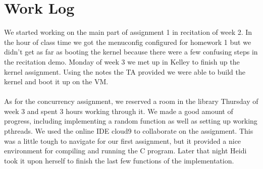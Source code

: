 \documentclass{article}
\begin{document}
\section*{Work Log}
We started working on the main part of assignment 1 in recitation of week 2. In the hour of 
class time we got the menuconfig configured for homework 1 but we didn't get as far as booting
the kernel because there were a few confusing steps in the recitation demo. Monday of week 3
we met up in Kelley to finish up the kernel assignment. Using the notes the TA provided we were
able to build the kernel and boot it up on the VM.
\\\\
As for the concurrency assignment, we reserved a room in the library Thursday of week 3 and
spent 3 hours working through it. We made a good amount of progress, including implementing
a random function as well as setting up working pthreads. We used the online IDE cloud9 to
collaborate on the assignment. This was a little tough to navigate for our first assignment,
but it provided a nice environment for compiling and running the C program. Later that night
Heidi took it upon herself to finish the last few functions of the implementation.
\end{document}
